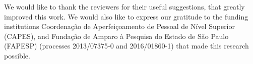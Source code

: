 
We would like to thank the reviewers for their useful suggestions, that greatly improved this work.
We would also like to express our gratitude to the funding institutions Coordenação de Aperfeiçoamento de Pessoal de Nível Superior (CAPES), and Fundação de Amparo à Pesquisa do Estado de São Paulo (FAPESP) (processes 2013/07375-0 and 2016/01860-1) that made this research possible.